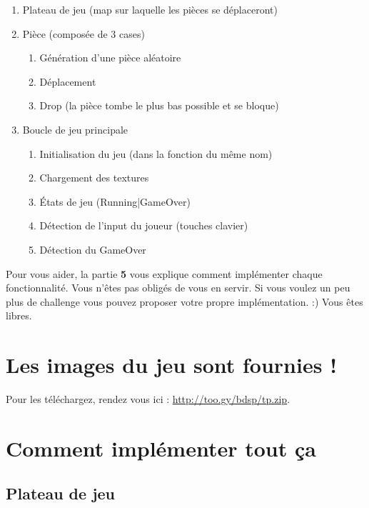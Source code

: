 \documentclass[a4paper]{article}
\begin{document}
\begin{enumerate}
    \item Plateau de jeu (map sur laquelle les pièces se déplaceront)
    \item Pièce (composée de 3 cases)
        \begin{enumerate}
            \item Génération d'une pièce aléatoire
            \item Déplacement
            \item Drop (la pièce tombe le plus bas possible et se bloque)
        \end{enumerate}
    \item Boucle de jeu principale
        \begin{enumerate}
            \item Initialisation du jeu (dans la fonction du même nom)
            \item Chargement des textures
            \item États de jeu (Running|GameOver)
            \item Détection de l'input du joueur (touches clavier)
            \item Détection du GameOver
        \end{enumerate}
\end{enumerate}

\begin{center}
    {\large\color{red} Pour vous aider, la partie \textbf{5} vous explique
    comment implémenter chaque fonctionnalité. Vous n'êtes pas obligés de vous
    en servir. Si vous voulez un peu plus de challenge vous pouvez proposer
    votre propre implémentation. :) Vous êtes libres.}
\end{center}

\section{Les images du jeu sont fournies !}

Pour les téléchargez, rendez vous ici : \url{http://too.gy/bdsp/tp.zip}.

\section{Comment implémenter tout ça}

\subsection{Plateau de jeu}
\end{document}
